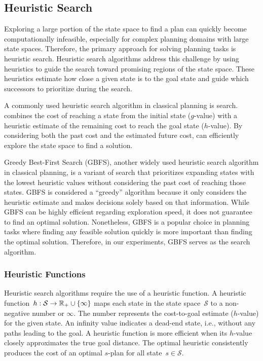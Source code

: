 \subsection{Heuristic Search}
\label{sec:background_heuristicsearch}

Exploring a large portion of the state space to find a plan can quickly become computationally infeasible, especially for complex planning domains with large state spaces. Therefore, the primary approach for solving planning tasks is heuristic search. Heuristic search algorithms address this challenge by using heuristics to guide the search toward promising regions of the state space. These heuristics estimate how close a given state is to the goal state and guide which successors to prioritize during the search.

A commonly used heuristic search algorithm in classical planning is \astar search. \astar combines the cost of reaching a state from the initial state ($g$-value) with a heuristic estimate of the remaining cost to reach the goal state ($h$-value). By considering both the past cost and the estimated future cost, \astar can efficiently explore the state space to find a solution.

Greedy Best-First Search (GBFS), another widely used heuristic search algorithm in classical planning, is a variant of \astar search that prioritizes expanding states with the lowest heuristic values without considering the past cost of reaching those states. GBFS is considered a ``greedy'' algorithm because it only considers the heuristic estimate and makes decisions solely based on that information. While GBFS can be highly efficient regarding exploration speed, it does not guarantee to find an optimal solution. Nonetheless, GBFS is a popular choice in planning tasks where finding any feasible solution quickly is more important than finding the optimal solution. Therefore, in our experiments, GBFS serves as the search algorithm.

\subsubsection{Heuristic Functions}
\label{sec:background_heuristicfunctions}

Heuristic search algorithms require the use of a heuristic function. A heuristic function~$h:\mathcal{S}\rightarrow\mathbb{R}_{+}\cup\{\infty\}$ maps each state in the state space~$\mathcal{S}$ to a non-negative number or $\infty$. The number represents the cost-to-goal estimate ($h$-value) for the given state. An infinity value indicates a dead-end state, i.e., without any paths leading to the goal. A heuristic function is more efficient when its $h$-value closely approximates the true goal distance. The optimal heuristic \hstar consistently produces the cost of an optimal $s$-plan for all state~$s \in \mathcal{S}$.

